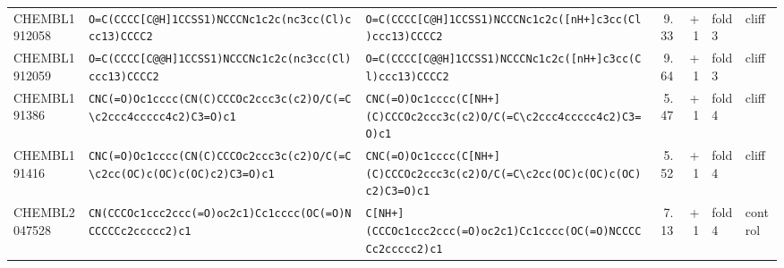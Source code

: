 \begin{longtable}{l p{4.4cm} p{4.4cm} r r l l}
CHEMBL1912058 & \texttt{O=\allowbreak{}C(\allowbreak{}CCCC[C@H]\allowbreak{}1CCSS1)\allowbreak{}NCCCNc1c2c(\allowbreak{}nc3cc(\allowbreak{}Cl)\allowbreak{}ccc13)\allowbreak{}CCCC2} & \texttt{O=\allowbreak{}C(\allowbreak{}CCCC[C@H]\allowbreak{}1CCSS1)\allowbreak{}NCCCNc1c2c(\allowbreak{}[nH+]\allowbreak{}c3cc(\allowbreak{}Cl)\allowbreak{}ccc13)\allowbreak{}CCCC2} & 9.33 & +1 & fold 3 & cliff \\
CHEMBL1912059 & \texttt{O=\allowbreak{}C(\allowbreak{}CCCC[C@@H]\allowbreak{}1CCSS1)\allowbreak{}NCCCNc1c2c(\allowbreak{}nc3cc(\allowbreak{}Cl)\allowbreak{}ccc13)\allowbreak{}CCCC2} & \texttt{O=\allowbreak{}C(\allowbreak{}CCCC[C@@H]\allowbreak{}1CCSS1)\allowbreak{}NCCCNc1c2c(\allowbreak{}[nH+]\allowbreak{}c3cc(\allowbreak{}Cl)\allowbreak{}ccc13)\allowbreak{}CCCC2} & 9.64 & +1 & fold 3 & cliff \\
CHEMBL191386 & \texttt{CNC(\allowbreak{}=\allowbreak{}O)\allowbreak{}Oc1cccc(\allowbreak{}CN(\allowbreak{}C)\allowbreak{}CCCOc2ccc3c(\allowbreak{}c2)\allowbreak{}O/\allowbreak{}C(\allowbreak{}=\allowbreak{}C\textbackslash{}c2ccc4ccccc4c2)\allowbreak{}C3=\allowbreak{}O)\allowbreak{}c1} & \texttt{CNC(\allowbreak{}=\allowbreak{}O)\allowbreak{}Oc1cccc(\allowbreak{}C[NH+]\allowbreak{}(\allowbreak{}C)\allowbreak{}CCCOc2ccc3c(\allowbreak{}c2)\allowbreak{}O/\allowbreak{}C(\allowbreak{}=\allowbreak{}C\textbackslash{}c2ccc4ccccc4c2)\allowbreak{}C3=\allowbreak{}O)\allowbreak{}c1} & 5.47 & +1 & fold 4 & cliff \\
CHEMBL191416 & \texttt{CNC(\allowbreak{}=\allowbreak{}O)\allowbreak{}Oc1cccc(\allowbreak{}CN(\allowbreak{}C)\allowbreak{}CCCOc2ccc3c(\allowbreak{}c2)\allowbreak{}O/\allowbreak{}C(\allowbreak{}=\allowbreak{}C\textbackslash{}c2cc(\allowbreak{}OC)\allowbreak{}c(\allowbreak{}OC)\allowbreak{}c(\allowbreak{}OC)\allowbreak{}c2)\allowbreak{}C3=\allowbreak{}O)\allowbreak{}c1} & \texttt{CNC(\allowbreak{}=\allowbreak{}O)\allowbreak{}Oc1cccc(\allowbreak{}C[NH+]\allowbreak{}(\allowbreak{}C)\allowbreak{}CCCOc2ccc3c(\allowbreak{}c2)\allowbreak{}O/\allowbreak{}C(\allowbreak{}=\allowbreak{}C\textbackslash{}c2cc(\allowbreak{}OC)\allowbreak{}c(\allowbreak{}OC)\allowbreak{}c(\allowbreak{}OC)\allowbreak{}c2)\allowbreak{}C3=\allowbreak{}O)\allowbreak{}c1} & 5.52 & +1 & fold 4 & cliff \\
CHEMBL2047528 & \texttt{CN(\allowbreak{}CCCOc1ccc2ccc(\allowbreak{}=\allowbreak{}O)\allowbreak{}oc2c1)\allowbreak{}Cc1cccc(\allowbreak{}OC(\allowbreak{}=\allowbreak{}O)\allowbreak{}NCCCCCc2ccccc2)\allowbreak{}c1} & \texttt{C[NH+]\allowbreak{}(\allowbreak{}CCCOc1ccc2ccc(\allowbreak{}=\allowbreak{}O)\allowbreak{}oc2c1)\allowbreak{}Cc1cccc(\allowbreak{}OC(\allowbreak{}=\allowbreak{}O)\allowbreak{}NCCCCCc2ccccc2)\allowbreak{}c1} & 7.13 & +1 & fold 4 & control \\

\end{longtable}
